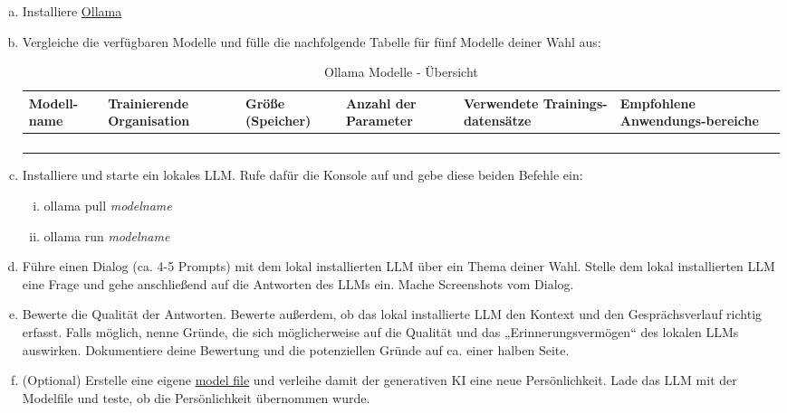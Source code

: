\documentclass[12pt,ngerman]{AssignmentClass}
\begin{document}
        
\begin{enumerate}[a)]

\item Installiere \href{https://ollama.com/download}{Ollama}

\item Vergleiche die verfügbaren Modelle und fülle die nachfolgende Tabelle für fünf Modelle deiner Wahl aus: 


\begin{table}[h!]
    \centering
    \begin{tabularx}{\textwidth}{X|X|X|X|X|X}
       Modell-name & Trainierende Organisation & Größe (Speicher) & Anzahl der Parameter & Verwendete Trainings-datensätze & Empfohlene Anwendungs-bereiche\\ \hline 
         &  &  &  &  & \\ \hline 
         &  &  &  &  & \\ \hline 
         &  &  &  &  & \\ \hline 
         &  &  &  &  & \\ 
    \end{tabularx}
    \caption{Ollama Modelle - Übersicht}
    \label{tab:my_label}
\end{table}


\item  Installiere und starte ein lokales LLM. Rufe dafür die Konsole auf und gebe diese beiden Befehle ein: 
\begin{enumerate}[i)] 
\item ollama pull \textit{modelname} 
\item ollama run \textit{modelname}
\end{enumerate} 
\item Führe einen Dialog (ca. 4-5 Prompts) mit dem lokal installierten LLM über ein Thema deiner Wahl. Stelle dem lokal installierten LLM eine Frage und gehe anschließend auf die Antworten des LLMs ein. Mache Screenshots vom Dialog.

\item Bewerte die Qualität der Antworten. Bewerte außerdem, ob das lokal installierte LLM den Kontext und den Gesprächsverlauf richtig erfasst. Falls möglich, nenne Gründe, die sich möglicherweise auf die Qualität und das „Erinnerungsvermögen“ des lokalen LLMs auswirken. Dokumentiere deine Bewertung und die potenziellen Gründe auf ca. einer halben Seite. 

\item (Optional) Erstelle eine eigene \href{https://github.com/ollama/ollama/blob/main/docs/modelfile.md}{model file} und verleihe damit der generativen KI eine neue Persönlichkeit. Lade das LLM mit der Modelfile und teste, ob die Persönlichkeit übernommen wurde. 
\end{enumerate}
\end{document}
